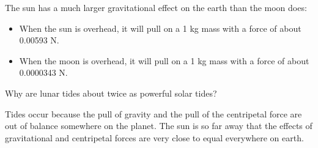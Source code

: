 The sun has a much larger gravitational effect on the earth than the moon does:
\begin{itemize}
\item When the sun is overhead,  it will pull on a 1 kg mass with a force of about 0.00593 N.
\item When the moon is overhead,  it will pull on a 1 kg mass with a force of about 0.0000343 N.
\end{itemize}

Why are lunar tides about twice as powerful solar tides?

Tides occur because the pull of gravity and the pull of the centripetal force are out of balance somewhere on the planet.  The sun is so far away that the effects of gravitational and centripetal forces are very close to equal everywhere on earth.





